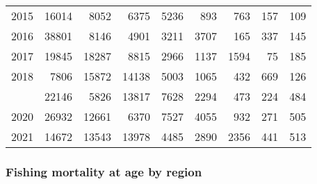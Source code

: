 \documentclass[
]{article}
\begin{document}
\begin{longtable}[t]{lrrrrrrrr}
2015 & 16014 & 8052 & 6375 & 5236 & 893 & 763 & 157 & 109\\
2016 & 38801 & 8146 & 4901 & 3211 & 3707 & 165 & 337 & 145\\
2017 & 19845 & 18287 & 8815 & 2966 & 1137 & 1594 & 75 & 185\\
2018 & 7806 & 15872 & 14138 & 5003 & 1065 & 432 & 669 & 126\\
\addlinespace
2019 & 22146 & 5826 & 13817 & 7628 & 2294 & 473 & 224 & 484\\
2020 & 26932 & 12661 & 6370 & 7527 & 4055 & 932 & 271 & 505\\
2021 & 14672 & 13543 & 13978 & 4485 & 2890 & 2356 & 441 & 513\\*
\end{longtable}

\hypertarget{fishing-mortality-at-age-by-region}{%
\subsubsection{Fishing mortality at age by
region}\label{fishing-mortality-at-age-by-region}}
\end{document}
